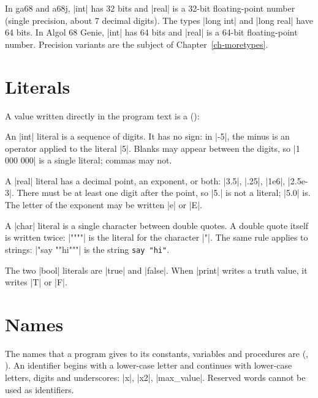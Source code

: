 
\begin{implnote}
In ga68 and a68j, \code|int| has 32 bits and \code|real| is a 32-bit
floating-point number (single precision, about 7 decimal digits). The
types \code|long int| and \code|long real| have 64 bits. In Algol 68 Genie,
\code|int| has 64 bits and \code|real| is a 64-bit floating-point number.
Precision variants are the subject of Chapter~\ref{ch-moretypes}.
\end{implnote}

\section{Literals}\label{sec-literals}

A value written directly in the program text is a 
():


An \code|int| literal is a sequence of digits. It has no sign: in
\code|-5|, the minus is an operator applied to the literal \code|5|.
Blanks may appear between the digits, so \code|1 000 000| is a single
literal; commas may not.

A \code|real| literal has a decimal point, an exponent, or both:
\code|3.5|, \code|.25|, \code|1e6|, \code|2.5e-3|. There must be at least
one digit after the point, so \code|5.| is not a literal; \code|5.0| is.
The letter of the exponent may be written \code|e| or \code|E|.

A \code|char| literal is a single character between double quotes. A
double quote itself is written twice: \code|""""| is the literal for the
character \code|"|. The same rule applies to strings: \code|"say ""hi"""|
is the string \texttt{say "hi"}.

The two \code|bool| literals are \code|true| and \code|false|. When
\code|print| writes a truth value, it writes \code|T| or \code|F|.

\section{Names}\label{sec-names}

The names that a program gives to its constants, variables and procedures
are  (, ). An identifier begins
with a lower-case letter and continues with lower-case letters, digits
and underscores: \code|x|, \code|x2|, \code|max_value|. Reserved words
cannot be used as identifiers.

